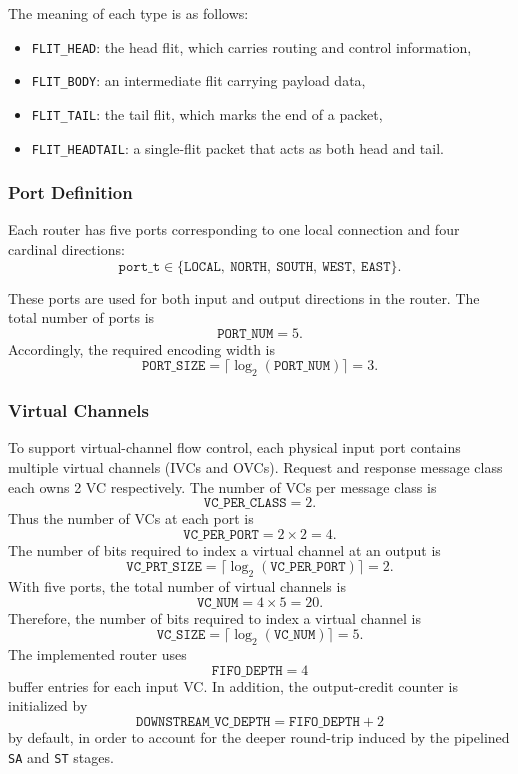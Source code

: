\documentclass[11pt,a4paper]{article}
\begin{document}
The meaning of each type is as follows:
\begin{itemize}
    \item \texttt{FLIT\_HEAD}: the head flit, which carries routing and control information,
    \item \texttt{FLIT\_BODY}: an intermediate flit carrying payload data,
    \item \texttt{FLIT\_TAIL}: the tail flit, which marks the end of a packet,
    \item \texttt{FLIT\_HEADTAIL}: a single-flit packet that acts as both head and tail.
\end{itemize}


\subsubsection*{Port Definition}
Each router has five ports corresponding to one local connection and four cardinal directions:
\[
\texttt{port\_t} \in 
\{\texttt{LOCAL},\ \texttt{NORTH},\ \texttt{SOUTH},\ \texttt{WEST},\ \texttt{EAST}\}.
\]

These ports are used for both input and output directions in the router. The total number of ports is
\[
\texttt{PORT\_NUM} = 5.
\]
Accordingly, the required encoding width is
\[
\texttt{PORT\_SIZE} = \lceil \log_2(\texttt{PORT\_NUM}) \rceil = 3.
\]

\subsubsection*{Virtual Channels}
To support virtual-channel flow control, each physical input port contains multiple virtual channels (IVCs and OVCs). Request and response message class each owns 2 VC respectively. The number of VCs per message class is
\[
\texttt{VC\_PER\_CLASS} = 2.
\]
Thus the number of VCs at each port is
\[
\texttt{VC\_PER\_PORT} = 2\times2 = 4.
\]
The number of bits required to index a virtual channel at an output is
\[
\texttt{VC\_PRT\_SIZE} = \lceil \log_2(\texttt{VC\_PER\_PORT}) \rceil = 2.
\]
With five ports, the total number of virtual channels is 
\[
\texttt{VC\_NUM} = 4\times5 = 20.
\]
Therefore, the number of bits required to index a virtual channel is
\[
\texttt{VC\_SIZE} = \lceil \log_2(\texttt{VC\_NUM}) \rceil = 5.
\]
The implemented router uses
\[
\texttt{FIFO\_DEPTH} = 4
\]
buffer entries for each input VC. In addition, the output-credit counter is initialized by
\[
\texttt{DOWNSTREAM\_VC\_DEPTH} = \texttt{FIFO\_DEPTH} + 2
\]
by default, in order to account for the deeper round-trip induced by the pipelined \texttt{SA} and \texttt{ST} stages.
\end{document}
